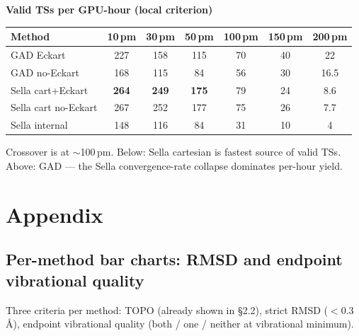 \documentclass[11pt]{article}
\begin{document}
\begin{center}
\textbf{Valid TSs per GPU-hour (local criterion)} \\[0.3em]
\begin{tabular}{l|cccccc}
\toprule
Method & 10\,pm & 30\,pm & 50\,pm & 100\,pm & 150\,pm & 200\,pm \\
\midrule
GAD Eckart                  & 227 & 158 & 115 & 70 & 40 & 22 \\
GAD no-Eckart               & 168 & 115 & 84 & 56 & 30 & 16.5 \\
Sella cart+Eckart           & \textbf{264} & \textbf{249} & \textbf{175} & 79 & 24 & 8.6 \\
Sella cart no-Eckart        & 267 & 252 & 177 & 75 & 26 & 7.7 \\
Sella internal              & 148 & 116 & 84 & 31 & 10 & 4 \\
\bottomrule
\end{tabular}
\end{center}

Crossover is at $\sim$100\,pm. Below: Sella cartesian is fastest source
of valid TSs. Above: GAD --- the Sella convergence-rate collapse
dominates per-hour yield.

\newpage
\section{Appendix}

\clearpage
\subsection{Per-method bar charts: RMSD and endpoint vibrational quality}

Three criteria per method: TOPO (already shown in §2.2), strict RMSD
($<0.3$\,\AA), endpoint vibrational quality (both / one / neither at
vibrational minimum).
\end{document}

